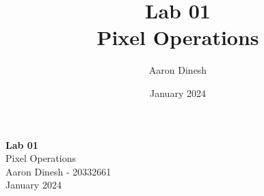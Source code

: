 \documentclass{article}
\title{
    \textbf{Lab 01}\\
    \vspace{1mm}
    {Pixel Operations}
}
\author{Aaron Dinesh}
\date{January 2024}
\begin{document}
    \fancyfoot{}


    \begin{titlepage}
        \vspace*{\fill}
        \begin{center}
          {\Huge \textbf{Lab 01}}\\[0.5cm]
          {\Large Pixel Operations}\\[0.4cm]
          {\Large Aaron Dinesh - 20332661}\\[0.3cm]
          January 2024
        \end{center}
        \vspace*{\fill}
    \end{titlepage}
    \newpage
    
    
    
    
    
\end{document}
